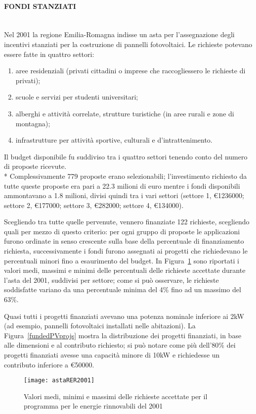 \documentclass[12pt,a4paper,openright,twoside]{report}
\newcommand{\myparagraph}[1]{\paragraph{#1}\mbox{}\\}
\begin{document}
\myparagraph{FONDI STANZIATI}
Nel 2001 la regione Emilia-Romagna indisse un asta per l'assegnazione degli incentivi stanziati per la costruzione di pannelli fotovoltaici. Le richieste potevano essere fatte in quattro settori:
\begin{enumerate}
\item aree residenziali (privati cittadini o imprese che raccogliessero le richieste di privati);
\item scuole e servizi per studenti universitari;
\item alberghi e attività correlate, strutture turistiche (in aree rurali e zone di montagna);
\item infrastrutture per attività sportive, culturali e d'intrattenimento. 
\end{enumerate}
Il budget disponibile fu suddiviso tra i quattro settori tenendo conto del numero di proposte ricevute.\\*
Complessivamente 779 proposte erano selezionabili; l'investimento richiesto da tutte queste proposte era pari a 22.3 milioni di euro mentre i fondi disponibili ammontavano a 1.8 milioni, divisi quindi tra i vari settori (settore 1, \euro1236000; settore 2, \euro177000; settore 3, \euro282000; settore 4, \euro134000).

Scegliendo tra tutte quelle pervenute, vennero finanziate 122 richieste, scegliendo quali per mezzo di questo criterio: per ogni gruppo di proposte le applicazioni furono ordinate in senso crescente sulla base della percentuale di finanziamento richiesta, successivamente i fondi furono assegnati ai progetti che richiedevano le percentuali minori fino a esaurimento del budget. In Figura~\ref{astaRER2001} sono riportati i valori medi, massimi e minimi delle percentuali delle richieste accettate durante l'asta del 2001, suddivisi per settore; come si può osservare, le richieste soddisfatte variano da una percentuale minima del 4\% fino ad un massimo del 63\%. 

Quasi tutti i progetti finanziati avevano una potenza nominale inferiore ai 2kW (ad esempio, pannelli fotovoltaici installati nelle abitazioni). La Figura~\ref{fundedPVprojs} mostra la distribuzione dei progetti finanziati, in base alle dimensioni e al contributo richiesto; si può notare come più dell'80\% dei progetti finanziati avesse una capacità minore di 10kW e richiedesse un contributo inferiore a \euro50000.

\begin{figure}[hbt]
	\centering
	\texttt{[image: astaRER2001]}
	\caption{Valori medi, minimi e massimi delle richieste accettate per il programma per le energie rinnovabili del 2001}
	\label{astaRER2001}
\end{figure}
\end{document}
